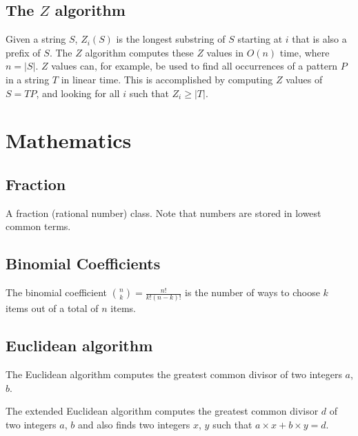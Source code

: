 \documentclass[11pt,a4paper,titlepage]{article}
\begin{document}
		\subsection{The $Z$ algorithm}
			Given a string $S$, $Z_i(S)$ is the longest substring of $S$ starting at $i$ that is also a prefix of $S$. The $Z$ algorithm computes these $Z$ values in $O(n)$ time, where $n = |S|$. $Z$ values can, for example, be used to find all occurrences of a pattern $P$ in a string $T$ in linear time. This is accomplished by computing $Z$ values of $S = T P$, and looking for all $i$ such that $Z_i \geq |T|$.

			

	\section{Mathematics}

		\subsection{Fraction}
			A fraction (rational number) class. Note that numbers are stored in lowest common terms.
			

		\subsection{Binomial Coefficients}
			The binomial coefficient $\binom{n}{k} = \frac{n!}{k!(n-k)!}$ is the number of ways to choose $k$ items out of a total of $n$ items.

			

			

			

		\subsection{Euclidean algorithm}
			The Euclidean algorithm computes the greatest common divisor of two integers $a$, $b$.
			

			The extended Euclidean algorithm computes the greatest common divisor $d$ of two integers $a$, $b$ and also finds two integers $x$, $y$ such that $a\times x + b\times y = d$.
			
\end{document}
